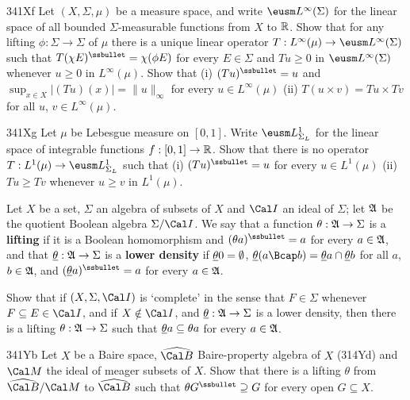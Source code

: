 {\spheader 341Xf Let $(X,\Sigma,\mu)$ be a measure space, and write
$\eusm L^{\infty}(\Sigma)$ for the linear space of all bounded
$\Sigma$-measurable functions from $X$ to $\Bbb R$.   Show that for any
lifting $\phi:\Sigma\to\Sigma$ of $\mu$ there is a unique linear
operator $T:L^{\infty}(\mu)\to\eusm L^{\infty}(\Sigma)$ such that
$T(\chi E)^{\ssbullet}=\chi(\phi E)$ for every $E\in\Sigma$ and
$Tu\ge 0$ in $\eusm L^{\infty}(\Sigma)$ whenever $u\ge 0$ in
$L^{\infty}(\mu)$.   Show that (i) $(Tu)^{\ssbullet}=u$ and
$\sup_{x\in X}|(Tu)(x)|=\|u\|_{\infty}$ for every $u\in L^{\infty}(\mu)$
(ii) $T(u\times v)=Tu\times Tv$ for all $u$, $v\in L^{\infty}(\mu)$.

\spheader 341Xg Let $\mu$ be Lebesgue measure on $[0,1]$.
Write $\eusm L^1_{\Sigma_L}$ for the
linear space of integrable functions $f:[0,1]\to\Bbb R$.   Show that there
is no operator $T:L^1(\mu)\to\eusm L^1_{\Sigma_L}$ such that (i)
$(Tu)^{\ssbullet}=u$ for every $u\in L^1(\mu)$ (ii) $Tu\ge Tv$ whenever
$u\ge v$ in $L^1(\mu)$.

 Let $X$ be a set, $\Sigma$ an
algebra of subsets of $X$ and $\Cal I$ an ideal of $\Sigma$;  let
$\frak A$ be the quotient Boolean algebra $\Sigma/\Cal I$.   We say that
a function $\theta:\frak A\to\Sigma$ is a {\bf lifting} if it is a
Boolean homomorphism and $(\theta a)^{\ssbullet}=a$ for every
$a\in\frak A$, and that $\underline{\theta}:\frak A\to\Sigma$ is a {\bf lower density} if $\underline{\theta} 0=\emptyset$,
$\undtheta(a\Bcap b)=\undtheta a\cap\undtheta b$ for all $a$,
$b\in\frak A$, and $(\undtheta a)^{\ssbullet}=a$ for
every $a\in\frak A$.

Show that if $(X,\Sigma,\Cal I)$ is `complete' in the sense that
$F\in\Sigma$ whenever $F\subseteq E\in\Cal I$, and if $X\notin\Cal I$,
and $\underline{\theta}:\frak A\to\Sigma$ is a lower density, then there is a
lifting $\theta:\frak A\to\Sigma$ such that
$\underline{\theta} a\subseteq\theta a$ for every $a\in\frak A$.

\spheader 341Yb Let $X$ be a Baire space, $\widehat{\Cal B}$
Baire-property algebra of $X$ (314Yd)
and $\Cal M$ the ideal of meager subsets of $X$.   Show that there is a
lifting $\theta$ from $\widehat{\Cal B}/\Cal M$ to $\widehat{\Cal B}$
such that $\theta G^{\ssbullet}\supseteq G$ for every open
$G\subseteq X$.   

}
